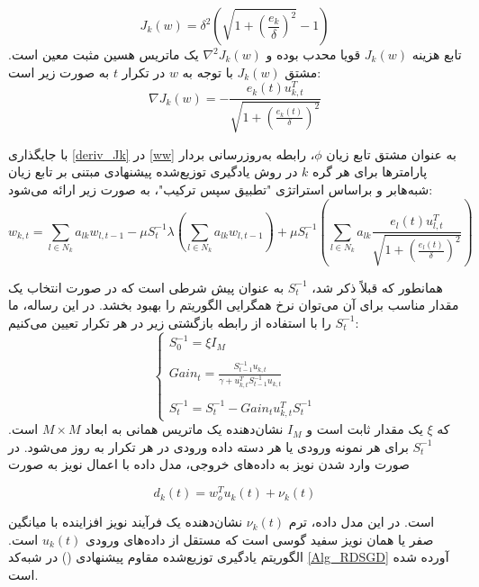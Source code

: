 \begin{equation}\label{Jk}
	J_k(w)=\delta^2(\sqrt{1+(\frac{e_k}{\delta})^2}-1)
\end{equation}
تابع هزینه $J_k(w)$  قویا محدب بوده و $\nabla^2J_k(w)$ یک ماتریس هسین مثبت معین است.  مشتق $J_k(w)$ با توجه به $w$ در تکرار $t$ به صورت زیر است:
\begin{equation}\label{deriv_Jk}
	\nabla J_k(w)=-\frac{e_k(t)u_{k,t}^T}{\sqrt{1+(\frac{e_k(t)}{\delta})^2}}
\end{equation}

با جایگذاری \ref{deriv_Jk} در \ref{ww} به عنوان مشتق تابع زیان $\phi$، رابطه به‌روزرسانی بردار پارامترها برای هر گره $k$ در روش یادگیری توزیع‌شده پیشنهادی مبتنی بر تابع زیان شبه‌هابر و براساس استراتژی "تطبیق سپس ترکیب"، به صورت زیر ارائه می‌شود:
\begin{equation}\label{complete_w}
	w_{k,t}=\sum_{l\in N_k}a_{lk}w_{l,t-1}-\mu S^{-1}_t \lambda(\sum_{l\in N_k}a_{lk}w_{l,t-1})+\mu S^{-1}_t (\sum_{l\in N_k}a_{lk}\frac{e_l(t)u_{l,t}^T}{\sqrt{1+(\frac{e_l(t)}{\delta})^2}})
\end{equation}

همانطور که قبلاً ذکر شد، $S^{-1}_t$ به عنوان پیش شرطی است که در صورت انتخاب یک مقدار مناسب برای آن می‌توان نرخ همگرایی الگوریتم را بهبود بخشد. در این رساله، ما $S^{-1}_t$ را با استفاده از رابطه بازگشتی زیر در هر تکرار تعیین می‌کنیم:
\begin{equation}\label{S_inv}
	\begin{cases} 
		S^{-1}_0=\xi I_M\\\\
		Gain_t=\frac{S^{-1}_{t-1} u_{k,t}} {\gamma+u_{k,t}^T S^{-1}_{t-1} u_{k,t}}\\\\
		S^{-1}_t=S^{-1}_t - Gain_t u^T_{k,t} S^{-1}_t
	\end{cases}
\end{equation}
که $\xi$ یک مقدار ثابت است و $I_M$ نشان‌دهنده یک ماتریس همانی به ابعاد $M \times M$ است. $S_t^{-1}$ برای هر نمونه ورودی یا هر دسته داده ورودی در هر تکرار به روز می‌شود. در صورت وارد شدن نویز به داده‌های خروجی، مدل داده با اعمال نویز به صورت

\begin{equation}\label{modelee}
	d_k (t)=w_o^T u_k (t)+\nu_k (t)
\end{equation}

 است. در این مدل داده، ترم $\nu_k (t)$ نشان‌دهنده یک فرآیند نویز افزاینده با میانگین صفر یا همان نویز سفید گوسی است که مستقل از داده‌های ورودی $u_k (t)$ است. الگوریتم یادگیری توزیع‌شده مقاوم پیشنهادی  () در شبه‌کد \ref{Alg_RDSGD} آورده شده است. 
\begin{latin}
	
\end{latin}

